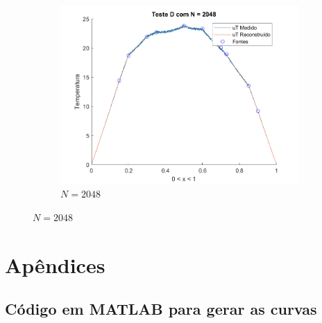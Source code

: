 \documentclass[12pt]{article}
\begin{document}
\begin{spacing}{1.5}
\begin{figure}[H]
\begin{subfigure}[t]{.485\linewidth}
        \centering
        \includegraphics[width=1\linewidth]{Imagens/FigD2048.png}
        \caption{$N=2048$}
        \label{fig:testeD_2048}
    \end{subfigure}
\end{figure}

\clearpage
{}
\nocite{*}
\printbibliography

\newpage
\appendix
\section*{Apêndices}
\renewcommand{\thesubsection}{\Alph{subsection}}


\subsection{Código em MATLAB para gerar as curvas}\label{cod_MATLAB}


\newpage


\end{spacing}
\end{document}
